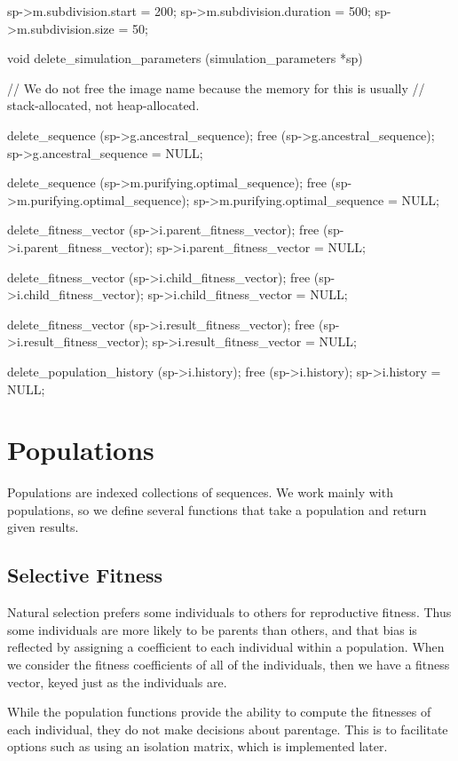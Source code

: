 \documentclass{article}
\begin{document}
\begin{ccode}
{  sp->m.subdivision.start			= 200;
  sp->m.subdivision.duration			= 500;
  sp->m.subdivision.size			= 50;
}

void delete_simulation_parameters (simulation_parameters *sp) {
  // We do not free the image name because the memory for this is usually
  // stack-allocated, not heap-allocated.

  delete_sequence (sp->g.ancestral_sequence);
  free (sp->g.ancestral_sequence);
  sp->g.ancestral_sequence = NULL;

  delete_sequence (sp->m.purifying.optimal_sequence);
  free (sp->m.purifying.optimal_sequence);
  sp->m.purifying.optimal_sequence = NULL;

  delete_fitness_vector (sp->i.parent_fitness_vector);
  free (sp->i.parent_fitness_vector);
  sp->i.parent_fitness_vector = NULL;

  delete_fitness_vector (sp->i.child_fitness_vector);
  free (sp->i.child_fitness_vector);
  sp->i.child_fitness_vector = NULL;

  delete_fitness_vector (sp->i.result_fitness_vector);
  free (sp->i.result_fitness_vector);
  sp->i.result_fitness_vector = NULL;

  delete_population_history (sp->i.history);
  free (sp->i.history);
  sp->i.history = NULL;
}
\end{ccode}

  \section{Populations}
    \label{sec:populations}

    Populations are indexed collections of sequences. We work mainly with
    populations, so we define several functions that take a population and
    return given results.

    \subsection{Selective Fitness}

      Natural selection prefers some individuals to others for reproductive
      fitness.  Thus some individuals are more likely to be parents than others,
      and that bias is reflected by assigning a coefficient to each individual
      within a population.  When we consider the fitness coefficients of all of
      the individuals, then we have a fitness vector, keyed just as the
      individuals are.

      While the population functions provide the ability to compute the
      fitnesses of each individual, they do not make decisions about parentage.
      This is to facilitate options such as using an isolation matrix, which is
      implemented later.
\end{document}
